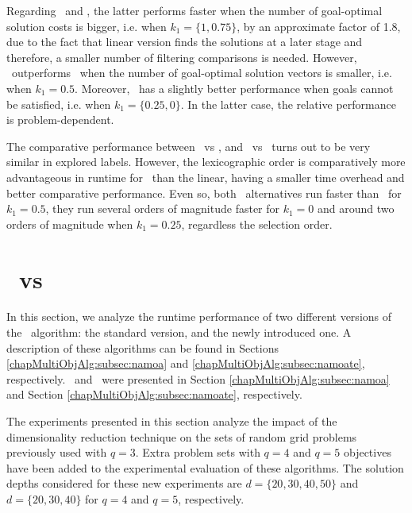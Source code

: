 Regarding \lexgolex \ and \lexgolin, the latter performs faster when the number of goal-optimal solution costs is bigger, i.e. when $k_1=\{1, 0.75\}$, by an approximate factor of 1.8, due to the fact that linear version finds the solutions at a later stage and therefore, a smaller number of filtering comparisons is needed. However, \lexgolex \ outperforms \lexgolin \ when the number of goal-optimal solution vectors is smaller, i.e. when $k_1=0.5$. Moreover, \lexgolex \ has a slightly better performance when goals cannot be satisfied, i.e. when $k_1=\{0.25, 0\}$. In the latter case, the relative performance is problem-dependent.

The comparative performance between \lexgolex \ vs \namoalex, and \lexgolin \ vs \namoalin \ turns out to be very similar in explored labels. However, the lexicographic order is comparatively more advantageous in runtime for \lexgo \ than the linear, having a smaller time overhead and better comparative performance. Even so, both \lexgo \ alternatives run faster than \namoa \ for $k_1=0.5$, they run several orders of magnitude faster for $k_1=0$ and around two orders of magnitude when $k_1=0.25$, regardless the selection order. 

\section{\texorpdfstring{\namoate}{NAMOA*dr} \ vs \texorpdfstring{\namoa}{NAMOA*}}
\label{chapEmpiricalAnalysis:sec:resultsgridsnamoate}

In this section, we analyze the runtime performance of two different versions of the \namoa \ algorithm: the standard version, and the newly introduced one. A description of these algorithms can be found in Sections \ref{chapMultiObjAlg:subsec:namoa} and \ref{chapMultiObjAlg:subsec:namoate}, respectively. \namoa \ and \namoate \ were presented in Section \ref{chapMultiObjAlg:subsec:namoa} and Section \ref{chapMultiObjAlg:subsec:namoate}, respectively. 

The experiments presented in this section analyze the impact of the dimensionality reduction technique on the sets of random grid problems previously used with $q=3$. Extra problem sets with $q=4$ and $q=5$ objectives have been added to the experimental evaluation of these algorithms. The solution depths considered for these new experiments are $d = \{20, 30, 40, 50 \}$ and $d = \{20, 30, 40 \}$ for $q=4$ and $q=5$, respectively.

